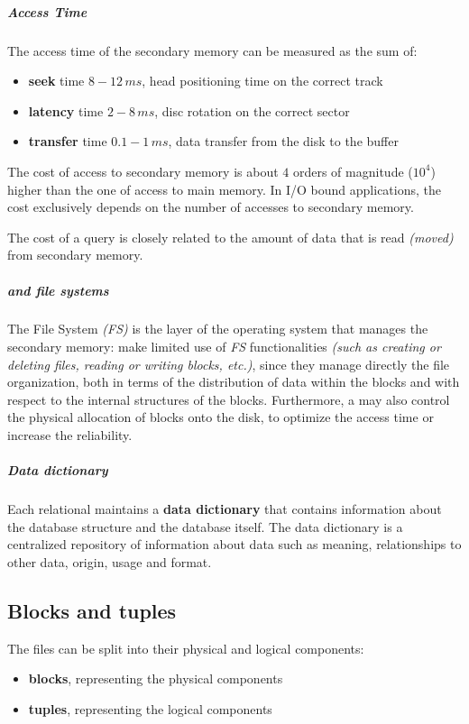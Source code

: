 \documentclass[english]{article}
\begin{document}
\subparagraph*{Access Time}
The access time of the secondary memory can be measured as the sum of:
\begin{itemize}
  \item \textbf{seek} time \(8-12 \, ms\), head positioning time on the correct track
  \item \textbf{latency} time \(2-8 \, ms\), disc rotation on the correct sector
  \item \textbf{transfer} time \(0.1-1 \, ms\), data transfer from the disk to the buffer
\end{itemize}

The cost of access to secondary memory is about \(4\) orders of magnitude (\(10^4\)) higher than the one of access to main memory.
In I/O bound applications, the cost exclusively depends on the number of accesses to secondary memory.

The cost of a query is closely related to the amount of data that is read \textit{(moved)} from secondary memory.

\subparagraph*{\dbms and file systems}
The File System \textit{(FS)} is the layer of the operating system that manages the secondary memory:
\dbms make limited use of \textit{FS} functionalities \textit{(such as creating or deleting files, reading or writing blocks, etc.)}, since they manage directly the file organization, both in terms of the distribution of data within the blocks and with respect to the internal structures of the blocks.
Furthermore, a \dbms may also control the physical allocation of blocks onto the disk, to optimize the access time or increase the reliability.

\subparagraph*{Data dictionary}

Each relational \dbms maintains a \textbf{data dictionary} that contains information about the database structure and the database itself.
The data dictionary is a centralized repository of information about data such as meaning, relationships to other data, origin, usage and format.

\subsection{Blocks and tuples}

The files can be split into their physical and logical components:

\begin{itemize}
  \item \textbf{blocks}, representing the physical components
  \item \textbf{tuples}, representing the logical components
\end{itemize}
\end{document}
